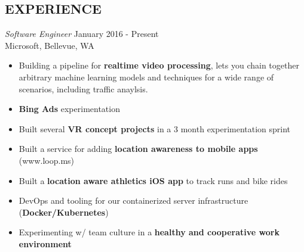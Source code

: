 \documentclass[margin,4pt]{res} %
\begin{document}


\address{
virajosinha@gmail\\
vsinha.com \\
github.com/vsinha
}



\address{1629 Summit Ave \#403\\ Seattle, WA 98122\\(408) 505-1275}


\begin{resume}



 
\section{EXPERIENCE} 

	{\sl Software Engineer} \hfill January 2016 - Present\\
		Microsoft, Bellevue, WA
		\begin{itemize} \itemsep -2pt
		\item Building a pipeline for \textbf{realtime video processing}, lets you chain together arbitrary machine learning models and techniques for a wide range of scenarios, including traffic anaylsis.
		\item \textbf{Bing Ads} experimentation
		\item Built several \textbf{VR concept projects} in a 3 month experimentation sprint
		\item Built a service for adding \textbf{location awareness to mobile apps} (www.loop.ms)
		\item Built a \textbf{location aware athletics iOS app} to track runs and bike rides
		\item DevOps and tooling for our containerized server infrastructure (\textbf{Docker/Kubernetes})
		\item Experimenting w/ team culture in a \textbf{healthy and cooperative work environment}
		\end{itemize}


\end{resume}
\end{document}
